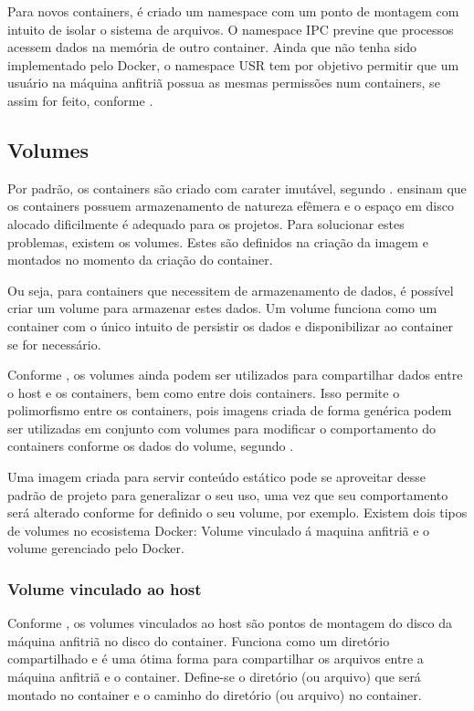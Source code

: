 \documentclass[
	12pt,				%
	openright,			%
	oneside,			%
	a4paper,			%
	chapter=TITLE,		%
	section=TITLE,		%
	english,			%
	french,				%
	spanish,			%
	brazil				%
	]{abntex2}
\begin{document}
Para novos containers, é criado um namespace com um ponto de montagem com intuito de isolar o sistema de arquivos. O namespace IPC previne que processos acessem dados na memória de outro container. Ainda que não tenha sido implementado pelo Docker, o namespace USR tem por objetivo permitir que um usuário na máquina anfitriã possua as mesmas permissões num containers, se assim for feito, conforme . 

\subsection{Volumes}

Por padrão, os containers são criado com carater imutável, segundo .  ensinam que os containers possuem armazenamento de natureza efêmera e o espaço em disco alocado dificilmente é adequado para os projetos. Para solucionar estes problemas, existem os volumes. Estes são definidos na criação da imagem e montados no momento da criação do container.

Ou seja, para containers que necessitem de armazenamento de dados, é possível criar um volume para armazenar estes dados. Um volume funciona como um container com o único intuito de persistir os dados e disponibilizar ao container se for necessário.

Conforme , os volumes ainda podem ser utilizados para compartilhar dados entre o host e os containers, bem como entre dois containers. Isso permite o polimorfismo entre os containers, pois imagens criada de forma genérica podem ser utilizadas em conjunto com volumes para modificar o comportamento do containers conforme os dados do volume, segundo .

Uma imagem criada para servir conteúdo estático pode se aproveitar desse padrão de projeto para generalizar o seu uso, uma vez que seu comportamento será alterado conforme for definido o seu volume, por exemplo. Existem dois tipos de volumes no ecosistema Docker: Volume vinculado á maquina anfitriã e o volume gerenciado pelo Docker.

\subsubsection{Volume vinculado ao host}

Conforme , os volumes vinculados ao host são pontos de montagem do disco da máquina anfitriã no disco do container. Funciona como um diretório compartilhado e é uma ótima forma para compartilhar os arquivos entre a máquina anfitriã e o container. Define-se o diretório (ou arquivo) que será montado no container e o caminho do diretório (ou arquivo) no container.
\end{document}
